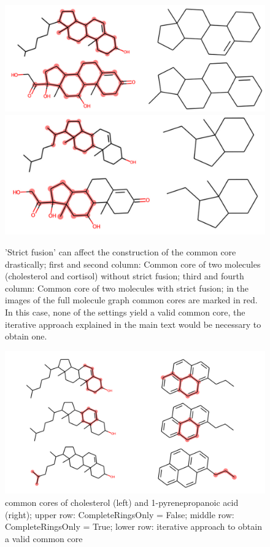 \begin{figure}
\includegraphics[scale=0.45]{sterols_wo_strictfusion}\includegraphics[scale=0.4]{sterols_w_strictfusion}

\caption{'Strict fusion' can affect the construction of the common core drastically; first and second column: Common core of two molecules (cholesterol
and cortisol) without strict fusion; third and fourth column: Common
core of two molecules with strict fusion; in the images of the full molecule graph common cores are marked in red. In this case, none of the settings yield a valid common core, the iterative approach explained in the main text would be necessary to obtain one. }

\end{figure}




\begin{figure}
	\includegraphics[scale=0.6]{cholesterol_pryenepropanoic_acid.png}
	
	\caption{common cores of cholesterol (left) and 1-pyrenepropanoic acid (right); upper row: CompleteRingsOnly = False; middle row: CompleteRingsOnly = True; lower row: iterative approach to obtain a valid {\trafo} common core}
	\label{fig:pyrene}
\end{figure}

